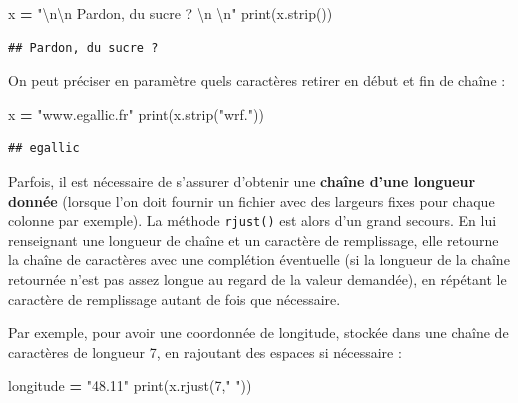 \documentclass[12pt,]{book}
\newenvironment{Shaded}{\begin{snugshade}}{\end{snugshade}}
\newcommand{\DecValTok}[1]{\textcolor[rgb]{0.00,0.00,0.81}{#1}}
\newcommand{\CharTok}[1]{\textcolor[rgb]{0.31,0.60,0.02}{#1}}
\newcommand{\StringTok}[1]{\textcolor[rgb]{0.31,0.60,0.02}{#1}}
\newcommand{\OperatorTok}[1]{\textcolor[rgb]{0.81,0.36,0.00}{\textbf{#1}}}
\newcommand{\BuiltInTok}[1]{#1}
\newcommand{\NormalTok}[1]{#1}
\numberwithin{equation}{section}
\numberwithin{countremarque}{section}
\begin{document}
\begin{Shaded}
\begin{Highlighting}[]
\NormalTok{x }\OperatorTok{=} \StringTok{"}\CharTok{\textbackslash{}n\textbackslash{}n}\StringTok{    Pardon, du sucre ?     }\CharTok{\textbackslash{}n}\StringTok{  }\CharTok{\textbackslash{}n}\StringTok{"}
\BuiltInTok{print}\NormalTok{(x.strip())}
\end{Highlighting}
\end{Shaded}

\begin{lstlisting}
## Pardon, du sucre ?
\end{lstlisting}

On peut préciser en paramètre quels caractères retirer en début et fin
de chaîne :

\begin{Shaded}
\begin{Highlighting}[]
\NormalTok{x }\OperatorTok{=} \StringTok{"www.egallic.fr"}
\BuiltInTok{print}\NormalTok{(x.strip(}\StringTok{"wrf."}\NormalTok{))}
\end{Highlighting}
\end{Shaded}

\begin{lstlisting}
## egallic
\end{lstlisting}

Parfois, il est nécessaire de s'assurer d'obtenir une \textbf{chaîne
d'une longueur donnée} (lorsque l'on doit fournir un fichier avec des
largeurs fixes pour chaque colonne par exemple). La méthode
\texttt{rjust()} est alors d'un grand secours. En lui renseignant une
longueur de chaîne et un caractère de remplissage, elle retourne la
chaîne de caractères avec une complétion éventuelle (si la longueur de
la chaîne retournée n'est pas assez longue au regard de la valeur
demandée), en répétant le caractère de remplissage autant de fois que
nécessaire.

Par exemple, pour avoir une coordonnée de longitude, stockée dans une
chaîne de caractères de longueur 7, en rajoutant des espaces si
nécessaire :

\begin{Shaded}
\begin{Highlighting}[]
\NormalTok{longitude }\OperatorTok{=} \StringTok{"48.11"}
\BuiltInTok{print}\NormalTok{(x.rjust(}\DecValTok{7}\NormalTok{,}\StringTok{" "}\NormalTok{))}
\end{Highlighting}
\end{Shaded}
\end{document}
